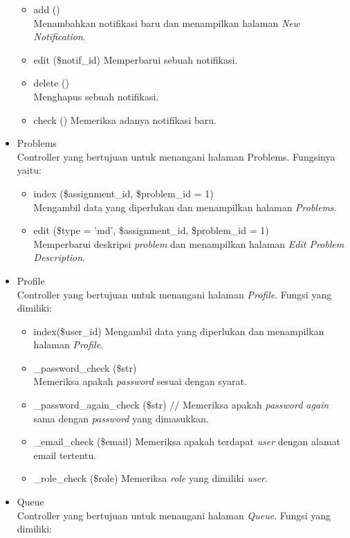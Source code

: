 \begin{itemize}
\begin{itemize}
        \item add () \\
 Menambahkan notifikasi baru dan menampilkan halaman \textit{New Notification}.
        \item edit (\$notif\_id)
 Memperbarui sebuah notifikasi.
        \item delete ()\\
 Menghapus sebuah notifikasi.
        \item check ()
 Memeriksa adanya notifikasi baru.
    \end{itemize}
        \item Problems \\
 Controller yang bertujuan untuk menangani halaman Problems. Fungsinya yaitu:
    \begin{itemize}
        \item index (\$assignment\_id, \$problem\_id = 1) \\
 Mengambil data yang diperlukan dan menampilkan halaman \textit{Problems}.
        \item edit (\$type = ’md’, \$assignment\_id, \$problem\_id = 1) \\
 Memperbarui deskripsi \textit{problem} dan menampilkan halaman \textit{Edit Problem Description}. 
    \end{itemize}
        \item Profile \\
        Controller yang bertujuan untuk menangani halaman \textit{Profile}. Fungsi yang dimiliki:
        \begin{itemize}
            \item index(\$user\_id)
 Mengambil data yang diperlukan dan menampilkan halaman \textit{Profile}.
            \item \_password\_check (\$str) \\
 Memeriksa apakah \textit{password} sesuai dengan syarat.
            \item \_password\_again\_check (\$str) //
 Memeriksa apakah \textit{password again} sama dengan \textit{password} yang dimasukkan.
            \item \_email\_check (\$email)
 Memeriksa apakah terdapat \textit{user} dengan alamat email tertentu.
            \item \_role\_check (\$role)
 Memeriksa \textit{role} yang dimiliki \textit{user}.
        \end{itemize}
        \item Queue \\
 Controller yang bertujuan untuk menangani halaman \textit{Queue}. Fungsi yang dimiliki:

\end{itemize}
